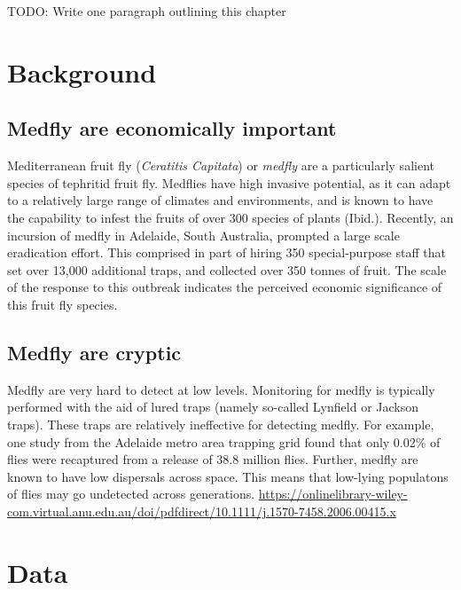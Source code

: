 \documentclass[
]{book}
\begin{document}
TODO: Write one paragraph outlining this chapter

\hypertarget{background}{%
\section{Background}\label{background}}

\hypertarget{medfly-are-economically-important}{%
\subsection{Medfly are economically important}\label{medfly-are-economically-important}}

Mediterranean fruit fly (\emph{Ceratitis Capitata}) or \emph{medfly} are a particularly salient species of tephritid fruit fly. Medflies have high invasive potential, as it can adapt to a relatively large range of climates and environments, and is known to have the capability to infest the fruits of over 300 species of plants (Ibid.). Recently, an incursion of medfly in Adelaide, South Australia, prompted a large scale eradication effort. This comprised in part of hiring 350 special-purpose staff that set over 13,000 additional traps, and collected over 350 tonnes of fruit. The scale of the response to this outbreak indicates the perceived economic significance of this fruit fly species.

\hypertarget{medfly-are-cryptic}{%
\subsection{Medfly are cryptic}\label{medfly-are-cryptic}}

Medfly are very hard to detect at low levels. Monitoring for medfly is typically performed with the aid of lured traps (namely so-called Lynfield or Jackson traps). These traps are relatively ineffective for detecting medfly. For example, one study from the Adelaide metro area trapping grid found that only 0.02\% of flies were recaptured from a release of 38.8 million flies. Further, medfly are known to have low dispersals across space. This means that low-lying populatons of flies may go undetected across generations. \url{https://onlinelibrary-wiley-com.virtual.anu.edu.au/doi/pdfdirect/10.1111/j.1570-7458.2006.00415.x}

\hypertarget{data}{%
\section{Data}\label{data}}
\end{document}
